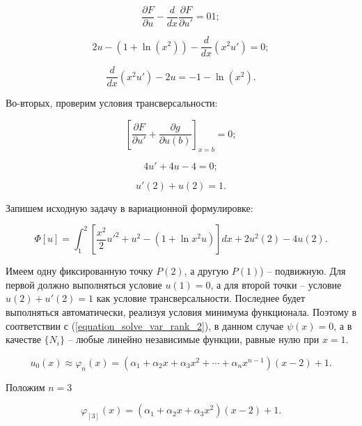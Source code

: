 \documentclass{article}
\begin{document}
\begin{displaymath}
	\frac{\partial F}{\partial u} - \frac{d}{dx} \frac{\partial F}{\partial u'} = 01;
\end{displaymath}

\begin{displaymath}
	2u - (1 + \ln(x^2)) - \frac{d}{dx}(x^2 u') = 0;
\end{displaymath}

\begin{displaymath}
	\frac{d}{dx}(x^2 u') - 2u = -1 - \ln(x^2).
\end{displaymath}

Во-вторых, проверим условия трансверсальности:

\begin{displaymath}
	\left[ \frac{\partial F}{\partial u'} + \frac{\partial g}{\partial u(b)} \right] _{x=b} = 0;
\end{displaymath}

\begin{displaymath}
	4u' + 4u - 4 = 0;
\end{displaymath}

\begin{displaymath}
	u'(2) + u(2) = 1.
\end{displaymath}

Запишем исходную задачу в вариационной формулировке:

\begin{equation}\label{equation_functional_rank_3}
	\Phi[u] = \int_{1}^{2} \left[ \frac{x^2}{2}u'^2 + u^2 - (1 + \ln{x^2}u) \right] dx + 2u^2(2) - 4u(2).
\end{equation}

Имеем одну фиксированную точку $P(2)$, а другую $P(1)$) -- подвижную. Для первой должно выполняться условие $u(1) = 0$, а для второй точки -- условие $u(2) + u'(2) = 1$ как условие трансверсальности. Последнее будет выполняться автоматически, реализуя условия минимума функционала. Поэтому в соответствии с (\ref{equation_solve_var_rank_2}), в данном случае $\psi(x) = 0$, а в качестве $\lbrace N_{i} \rbrace$ -- любые линейно независимые функции, равные нулю при $x = 1$.

\begin{displaymath}
	u_{0}(x) \approx \varphi_{n}(x) = (\alpha_{1} + \alpha_{2}x + \alpha_{3}x^2 + \cdots + \alpha_{n}x^{n-1})(x-2)+1.
\end{displaymath}

\noindent Положим $n = 3$

\begin{displaymath}
	\varphi_{[3]}(x) = (\alpha_{1} + \alpha_{2}x + \alpha_{3}x^2)(x-2)+1.
\end{displaymath}
\end{document}
